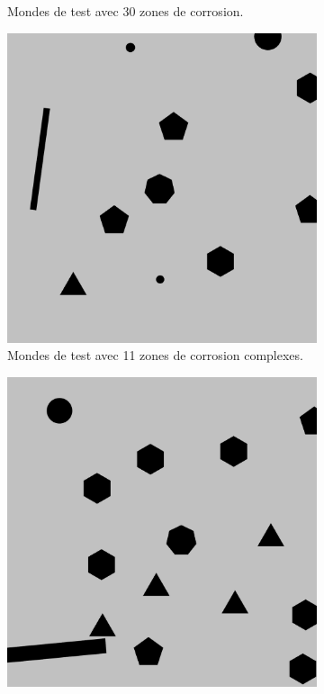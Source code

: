 \documentclass[francais,RandD]{rapportPFE}
\begin{document}
\begin{figure}[H]
\begin{subfigure}[t]{0.15\linewidth}
				\caption{Mondes de test avec 30 zones de corrosion.}
				\label{fig:test_model_30_1}
			\end{subfigure}
			\hfill
			\begin{subfigure}[t]{0.15\linewidth}
					\includegraphics[width=\linewidth]{graphics/test_model_11_complex_1.png}
					\caption{Mondes de test avec 11 zones de corrosion complexes.}
					\label{fig:test_model_11_complex_1}
			\end{subfigure}
			\hfill
			\begin{subfigure}[t]{0.15\linewidth}
				\centering
				\includegraphics[width=\linewidth]{graphics/test_model_15_complex_1.png}

\end{subfigure}
\end{figure}
\end{document}
